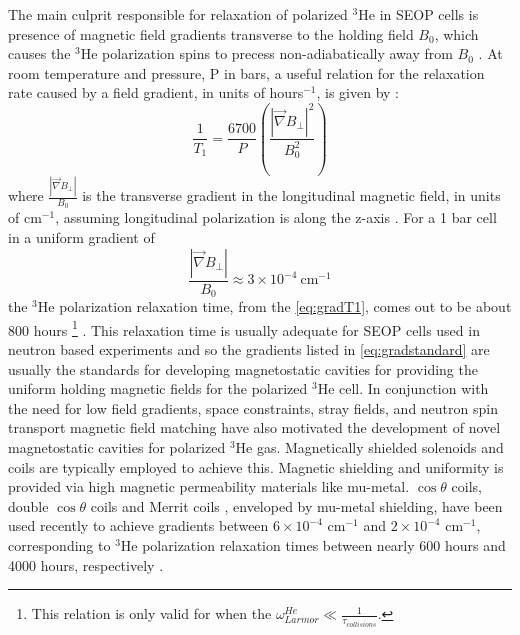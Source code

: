 The main culprit responsible for relaxation of polarized $^3$He in SEOP cells is presence of magnetic field gradients transverse to the holding field $B_0$, which causes the $^3$He polarization spins to precess non-adiabatically away from $B_0$ \cite{Gamblin1965, Schearer1965, Cates1988a, Cates1988b, McGregor1990, Bohler1994}. At room temperature and pressure, P in bars, a useful relation for the relaxation rate caused by a field gradient, in units of hours$^{-1}$, is given by \cite{McIver2009}:
\begin{equation}
    \frac{1}{T_1} = \frac{6700}{P} \left ( \frac{\left \lvert \Vec{\nabla} B_{\perp} \right \rvert ^2}{B_0^2} \right )
\label{eq:gradT1}
\end{equation}
where $ \frac{ \left \lvert \Vec{\nabla} B_{\perp} \right \rvert}{B_0}$ is the transverse gradient in the longitudinal magnetic field, in units of cm$^{-1}$, assuming longitudinal polarization is along the z-axis \cite{Cates1988b}. For a 1 bar cell in a uniform gradient of
\begin{equation}
     \frac{ \left \lvert \Vec{\nabla} B_{\perp} \right \rvert}{B_0} \approx 3 \times 10^{-4}  ~\text{cm$^{-1}$}
\label{eq:gradstandard}
\end{equation}
the $^3$He polarization relaxation time, from the \cref{eq:gradT1}, comes out to be about 800 hours \footnote{This relation is only valid for when the $ \omega_{Larmor}^{He} \ll \frac{1}{\tau_{collisions}}$.} \cite{Chen2020}. This relaxation time is usually adequate for SEOP cells used in neutron based experiments and so the gradients listed in \cref{eq:gradstandard} are usually the standards for developing magnetostatic cavities for providing the uniform holding magnetic fields for the polarized $^3$He cell. In conjunction with the need for low field gradients, space constraints, stray fields, and neutron spin transport magnetic field matching have also motivated the development of novel magnetostatic cavities for polarized $^3$He gas. Magnetically shielded solenoids and coils are typically employed to achieve this. Magnetic shielding and uniformity is provided via high magnetic permeability materials like mu-metal. $\cos \theta$ coils, double $\cos \theta$ coils and Merrit coils \cite{Merritt1983, Babcock2019, Chen2020}, enveloped by mu-metal shielding, have been used recently to achieve gradients between $6 \times 10^{-4} $ cm$^{-1}$ and $2 \times 10^{-4} $ cm$^{-1}$, corresponding to $^3$He polarization relaxation times between nearly 600 hours and 4000 hours, respectively \cite{Chen2014}.

